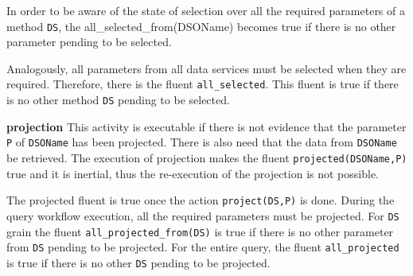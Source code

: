 \documentclass{acm_proc_article-sp}
\begin{document}


In order to be aware of the state of selection over all the required parameters of a method \texttt{DS}, the all_selected_from(DSOName) becomes true if there is no other parameter pending to be selected.

%



Analogously, all parameters from all data services must be selected when they are required. Therefore, there is the fluent \texttt{all\_selected}. This fluent is true if there is no other method \texttt{DS} pending to be selected.

%



\textbf{projection} This activity is executable if there is not evidence that the parameter \texttt{P} of \texttt{DSOName} has been projected. There is also need that the data from \texttt{DSOName} be retrieved. The execution of projection makes the fluent \texttt{projected(DSOName,P)} true and it is inertial, thus the re-execution of the projection is not possible.
               
%



The projected fluent is true once the action \texttt{project(DS,P)} is done. During the query workflow execution, all the required parameters must be projected. For \texttt{DS} grain the fluent \texttt{all\_projected\_from(DS)} is true if there is no other parameter from \texttt{DS} pending to be projected. For the entire query, the fluent \texttt{all\_projected} is true if there is no other \texttt{DS} pending to be projected.
                
%
\end{document}

